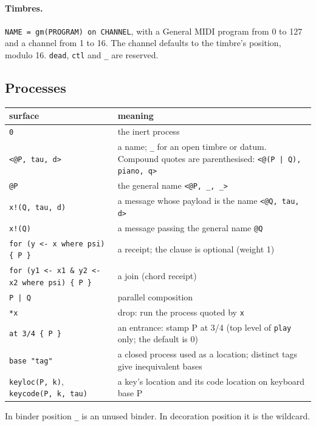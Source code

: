 \documentclass[11pt,a4paper]{article}
\newcommand{\ttx}[1]{\texttt{#1}}
\begin{document}
\paragraph{Timbres.} \ttx{NAME = gm(PROGRAM) on CHANNEL}, with a General MIDI
program from 0 to 127 and a channel from 1 to 16. The channel defaults to the
timbre's position, modulo 16. \ttx{dead}, \ttx{ctl} and \ttx{\_} are reserved.

\subsection{Processes}

\begin{center}
\small
\begin{tabularx}{\linewidth}{@{}l>{\raggedright\arraybackslash}X@{}}
\toprule
surface & meaning \\
\midrule
\ttx{0} & the inert process \\
\ttx{<@P, tau, d>} & a name; \ttx{\_} for an open timbre or datum.
  Compound quotes are parenthesised: \ttx{<@(P | Q), piano, q>} \\
\ttx{@P} & the general name \ttx{<@P, \_, \_>} \\
\ttx{x!(Q, tau, d)} & a message whose payload is the name \ttx{<@Q, tau, d>} \\
\ttx{x!(Q)} & a message passing the general name \ttx{@Q} \\
\ttx{for (y <- x where psi) \{ P \}} & a receipt; the clause is optional
  (weight 1) \\
\ttx{for (y1 <- x1 \& y2 <- x2 where psi) \{ P \}} & a join (chord receipt) \\
\ttx{P | Q} & parallel composition \\
\ttx{*x} & drop: run the process quoted by \ttx{x} \\
\ttx{at 3/4 \{ P \}} & an entrance: stamp P at 3/4 (top level of \ttx{play}
  only; the default is 0) \\
\ttx{base "tag"} & a closed process used as a location; distinct tags give
  inequivalent bases \\
\ttx{keyloc(P, k)}, \ttx{keycode(P, k, tau)} & a key's location and its code
  location on keyboard base P \\
\bottomrule
\end{tabularx}
\end{center}

\noindent In binder position \ttx{\_} is an unused binder. In decoration
position it is the wildcard.
\end{document}
